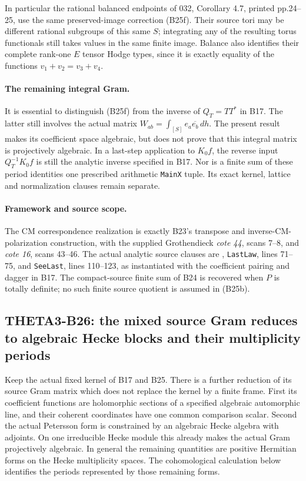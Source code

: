 \documentclass[11pt]{article}
\theoremstyle{definition}\newtheorem{definition}[theorem]{Definition}\newtheorem{remark}[theorem]{Remark}
\begin{document}
In particular the rational balanced
endpoints of 032, Corollary 4.7, printed
pp.24--25, use the same preserved-image
correction (B25f).  Their source tori may
be different rational subgroups of this
same $S$; integrating any of the resulting
torus functionals still takes values in
the same finite image.
Balance also identifies their complete
rank-one $E$ tensor Hodge types, since it
is exactly equality of the functions
$v_1+v_2=v_3+v_4$.

\paragraph{The remaining integral Gram.}
It is essential to distinguish (B25f) from
the inverse of $Q_T=TT^*$ in B17.
The latter still involves the actual matrix
$W_{ab}=\int_{[S]}e_a\overline{e_b}\,dh$.
The present result makes its coefficient
space algebraic, but does not prove that
this integral matrix is projectively algebraic.
In a last-step application to $K_0f$, the
reverse input $Q_T^{-1}K_0f$ is still the
analytic inverse specified in B17.
Nor is a finite sum of these period identities
one prescribed arithmetic \texttt{MainX}
tuple.  Its exact kernel, lattice and
normalization clauses remain separate.

\paragraph{Framework and source scope.}
The CM correspondence realization is exactly
B23's transpose and inverse-CM-polarization
construction, with the supplied Grothendieck
\emph{cote 44}, scans 7--8, and
\emph{cote 16}, scans 43--46.
The actual analytic source clauses are
,
\texttt{LastLaw}, lines 71--75, and
\texttt{SeeLast}, lines 110--123, as
instantiated with the coefficient pairing
and dagger in B17.  The compact-source
finite sum of B24 is recovered when
$P$ is totally definite; no such finite
source quotient is assumed in (B25b).


\subsection{THETA3-B26: the mixed source Gram reduces to algebraic Hecke blocks and their multiplicity periods}\label{B26}

Keep the actual fixed kernel of B17 and B25.  There is a further
reduction of its source Gram matrix which does not replace the
kernel by a finite frame.  First its coefficient functions are
holomorphic sections of a specified algebraic automorphic line,
and their coherent coordinates have one common comparison scalar.
Second the actual Petersson form is constrained by an algebraic
Hecke algebra with adjoints.  On one irreducible Hecke module this
already makes the actual Gram projectively algebraic.  In general
the remaining quantities are positive Hermitian forms on the
Hecke multiplicity spaces.  The cohomological calculation below
identifies the periods represented by those remaining forms.
\end{document}
